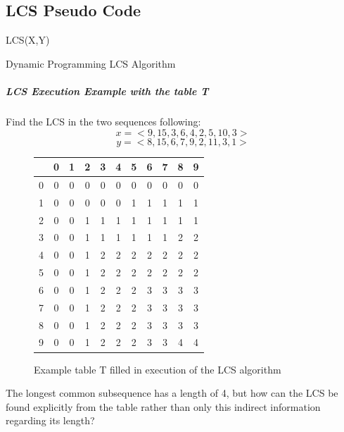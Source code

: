 \documentclass[12pt,letterpaper]{article}
\begin{document}
\subsection{LCS Pseudo Code}
\begin{algorithm}
LCS(X,Y) 
\caption{Dynamic Programming LCS Algorithm}
\label{LCS}
\end{algorithm}
\subparagraph{LCS Execution Example with the table T}
Find the LCS in the two sequences following:
\[x=<9,15,3,6,4,2,5,10,3>\]
\[y=<8,15,6,7,9,2,11,3,1>\]
\begin{figure}[h]
\centering
\begin{tabular}{|c|c|c|c|c|c|c|c|c|c|c|}
\hline
  &0&1&2&3&4&5&6&7&8&9\\ \hline \hline
 0&0&0&0&0&0&0&0&0&0&0\\ \hline
 1&0&0&0&0&0&1&1&1&1&1\\ \hline
 2&0&0&1&1&1&1&1&1&1&1\\ \hline
 3&0&0&1&1&1&1&1&1&2&2\\ \hline
 4&0&0&1&2&2&2&2&2&2&2\\ \hline
 5&0&0&1&2&2&2&2&2&2&2\\ \hline
 6&0&0&1&2&2&2&3&3&3&3\\ \hline
 7&0&0&1&2&2&2&3&3&3&3\\ \hline
 8&0&0&1&2&2&2&3&3&3&3\\ \hline
 9&0&0&1&2&2&2&3&3&4&4\\ \hline
\end{tabular}
\caption{Example table T filled in execution of the LCS algorithm}
\end{figure}
The longest common subsequence has a length of 4, but how can the LCS be found explicitly from the table rather than only this indirect information regarding its length?
\end{document}

